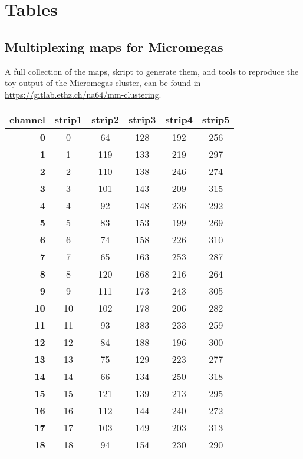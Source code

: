 
\chapter{Tables}

\label{AppendixF}

\section{Multiplexing maps for Micromegas}
\label{sec:multiplex-maps}

A full collection of the maps, skript to generate them, and tools to reproduce the toy output of the Micromegas cluster, can be found in \url{https://gitlab.ethz.ch/na64/mm-clustering}.

\begin{longtable}{|r|c|c|c|c|c|}    
  \hline
  \textbf{channel} & strip1 & strip2 & strip3 & strip4& strip5 \\
  \hline
  \textbf{0} & 0 &64 & 128 & 192 & 256 \\
  \textbf{1} & 1 &119 & 133 & 219 & 297 \\
  \textbf{2} & 2 &110 & 138 & 246 & 274 \\
  \textbf{3} & 3 &101 & 143 & 209 & 315 \\
  \textbf{4} & 4 &92 & 148 & 236 & 292 \\
  \textbf{5} & 5 &83 & 153 & 199 & 269 \\
  \textbf{6} & 6 &74 & 158 & 226 & 310 \\
  \textbf{7} & 7 &65 & 163 & 253 & 287 \\
  \textbf{8} & 8 &120 & 168 & 216 & 264 \\
  \textbf{9} & 9 &111 & 173 & 243 & 305 \\
  \textbf{10} & 10 &102 & 178 & 206 & 282 \\
  \textbf{11} & 11 &93 & 183 & 233 & 259 \\
  \textbf{12} & 12 &84 & 188 & 196 & 300 \\
  \textbf{13} & 13 &75 & 129 & 223 & 277 \\
  \textbf{14} & 14 &66 & 134 & 250 & 318 \\
  \textbf{15} & 15 &121 & 139 & 213 & 295 \\
  \textbf{16} & 16 &112 & 144 & 240 & 272 \\
  \textbf{17} & 17 &103 & 149 & 203 & 313 \\
  \textbf{18} & 18 &94 & 154 & 230 & 290 \\

\end{longtable}
